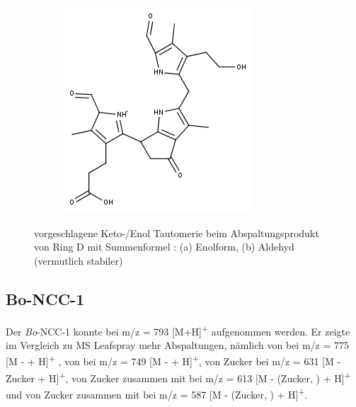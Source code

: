 \begin{figure}[!htbp]
\begin{subfigure}[b]{0.5\textwidth}
    \includegraphics[width=\textwidth]{figures/Kapitel7/Kataboliten/fragmentation_structures/VWA_Katabolit_647-CO2-RingD_480_MH_Ketoform.png}
    \caption{}
    \label{fig:DNCC2991}
  \end{subfigure}
  \caption[Vorschlag für die Keto-Enol-Tautomerie der Ring D Abspaltung von \textit{Bo}-NCC-3, Quelle: Autor]{vorgeschlagene Keto-/Enol Tautomerie beim Abspaltungsprodukt von Ring D mit Summenformel : (a) Enolform, (b) Aldehyd (vermutlich stabiler)}
\end{figure}

\pagebreak
\subsection{Bo-NCC-1} \label{sec:ESIMSBoNCC1}

Der \textit{Bo}-NCC-1 konnte bei m/z = 793 [M+H]\textsuperscript{+} aufgenommen werden. Er zeigte im Vergleich zu MS Leafspray mehr Abspaltungen, nämlich von  bei m/z = 775 [M -  + H]\textsuperscript{+} , von  bei m/z = 749 [M -  + H]\textsuperscript{+}, von Zucker bei m/z = 631 [M - Zucker + H]\textsuperscript{+}, von Zucker zusammen mit  bei m/z = 613 [M - (Zucker, ) + H]\textsuperscript{+} und von Zucker zusammen mit  bei m/z = 587 [M - (Zucker, ) + H]\textsuperscript{+}. 


